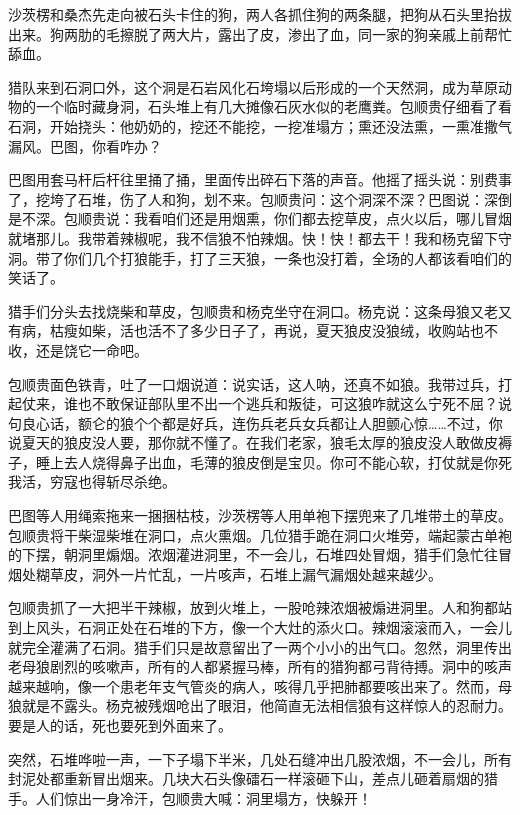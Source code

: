 \par 沙茨楞和桑杰先走向被石头卡住的狗，两人各抓住狗的两条腿，把狗从石头里抬拔出来。狗两肋的毛擦脱了两大片，露出了皮，渗出了血，同一家的狗亲戚上前帮忙舔血。
\par 猎队来到石洞口外，这个洞是石岩风化石垮塌以后形成的一个天然洞，成为草原动物的一个临时藏身洞，石头堆上有几大摊像石灰水似的老鹰粪。包顺贵仔细看了看石洞，开始挠头：他奶奶的，挖还不能挖，一挖准塌方；熏还没法熏，一熏准撒气漏风。巴图，你看咋办？
\par 巴图用套马杆后杆往里捅了捅，里面传出碎石下落的声音。他摇了摇头说：别费事了，挖垮了石堆，伤了人和狗，划不来。包顺贵问：这个洞深不深？巴图说：深倒是不深。包顺贵说：我看咱们还是用烟熏，你们都去挖草皮，点火以后，哪儿冒烟就堵那儿。我带着辣椒呢，我不信狼不怕辣烟。快！快！都去干！我和杨克留下守洞。带了你们几个打狼能手，打了三天狼，一条也没打着，全场的人都该看咱们的笑话了。
\par 猎手们分头去找烧柴和草皮，包顺贵和杨克坐守在洞口。杨克说：这条母狼又老又有病，枯瘦如柴，活也活不了多少日子了，再说，夏天狼皮没狼绒，收购站也不收，还是饶它一命吧。
\par 包顺贵面色铁青，吐了一口烟说道：说实话，这人呐，还真不如狼。我带过兵，打起仗来，谁也不敢保证部队里不出一个逃兵和叛徒，可这狼咋就这么宁死不屈？说句良心话，额仑的狼个个都是好兵，连伤兵老兵女兵都让人胆颤心惊……不过，你说夏天的狼皮没人要，那你就不懂了。在我们老家，狼毛太厚的狼皮没人敢做皮褥子，睡上去人烧得鼻子出血，毛薄的狼皮倒是宝贝。你可不能心软，打仗就是你死我活，穷寇也得斩尽杀绝。
\par 巴图等人用绳索拖来一捆捆枯枝，沙茨楞等人用单袍下摆兜来了几堆带土的草皮。包顺贵将干柴湿柴堆在洞口，点火熏烟。几位猎手跪在洞口火堆旁，端起蒙古单袍的下摆，朝洞里煽烟。浓烟灌进洞里，不一会儿，石堆四处冒烟，猎手们急忙往冒烟处糊草皮，洞外一片忙乱，一片咳声，石堆上漏气漏烟处越来越少。
\par 包顺贵抓了一大把半干辣椒，放到火堆上，一股呛辣浓烟被煽进洞里。人和狗都站到上风头，石洞正处在石堆的下方，像一个大灶的添火口。辣烟滚滚而入，一会儿就完全灌满了石洞。猎手们只是故意留出了一两个小小的出气口。忽然，洞里传出老母狼剧烈的咳嗽声，所有的人都紧握马棒，所有的猎狗都弓背待搏。洞中的咳声越来越响，像一个患老年支气管炎的病人，咳得几乎把肺都要咳出来了。然而，母狼就是不露头。杨克被残烟呛出了眼泪，他简直无法相信狼有这样惊人的忍耐力。要是人的话，死也要死到外面来了。
\par 突然，石堆哗啦一声，一下子塌下半米，几处石缝冲出几股浓烟，不一会儿，所有封泥处都重新冒出烟来。几块大石头像礌石一样滚砸下山，差点儿砸着扇烟的猎手。人们惊出一身冷汗，包顺贵大喊：洞里塌方，快躲开！
